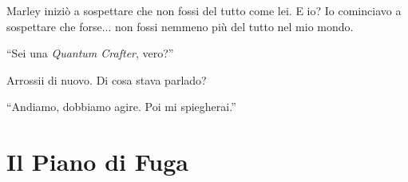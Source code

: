 Marley iniziò a sospettare che non fossi del tutto come lei. E io? Io cominciavo a sospettare che forse... non fossi nemmeno più del tutto nel mio mondo.


\begin{dialogue}
 \enquote{Sei una \textit{Quantum Crafter}, vero?}
\end{dialogue}

Arrossii di nuovo. Di cosa stava parlado?

\begin{dialogue}
 \enquote{Andiamo, dobbiamo agire. Poi mi spiegherai.}
\end{dialogue}

\begin{center}
\begin{minipage}{0.7\textwidth}
    \centering
\end{minipage}
\end{center}

\section{Il Piano di Fuga}

